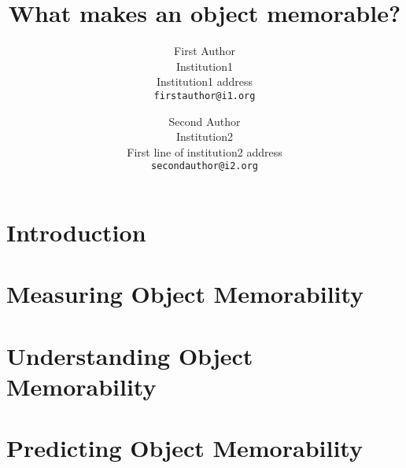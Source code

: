 \documentclass[10pt,twocolumn,letterpaper]{article}
\begin{document}
\title{What makes an object memorable?}

\author{First Author\\
Institution1\\
Institution1 address\\
{\tt\small firstauthor@i1.org}
\and
Second Author\\
Institution2\\
First line of institution2 address\\
{\tt\small secondauthor@i2.org}
}

\maketitle


\begin{abstract}
  
\end{abstract}

\section{Introduction}



\section{Measuring Object Memorability}



\section{Understanding Object Memorability}



\section{Predicting Object Memorability}




{\small


}
\end{document}
